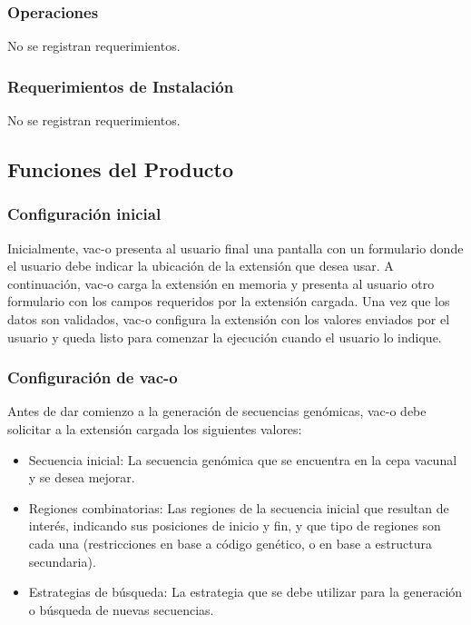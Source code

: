 \documentclass[10pt,a4paper]{article}
\begin{document}
    \subsubsection{Operaciones}
    No se registran requerimientos.

    \subsubsection{Requerimientos de Instalaci\'on}
    No se registran requerimientos.

  \subsection{Funciones del Producto}
  
  \subsubsection{Configuraci\'on inicial}
  Inicialmente, vac-o presenta al usuario final una pantalla con un formulario donde el usuario debe indicar la ubicaci\'on de la extensi\'on que desea usar. A continuaci\'on, vac-o carga la extensi\'on en memoria y presenta al usuario otro formulario con los campos requeridos por la extensi\'on cargada.
  Una vez que los datos son validados, vac-o configura la extensi\'on con los valores enviados por el usuario y queda listo para comenzar la ejecuci\'on cuando el usuario lo indique.

  \subsubsection{Configuraci\'on de vac-o}
  Antes de dar comienzo a la generaci\'on de secuencias gen\'omicas, vac-o debe solicitar a la extensi\'on cargada los siguientes valores:
  \begin{itemize}
    \item Secuencia inicial: La secuencia gen\'omica que se encuentra en la cepa vacunal y se desea mejorar.
    \item Regiones combinatorias: Las regiones de la secuencia inicial que resultan de inter\'es, indicando sus posiciones de inicio y fin, y que tipo de regiones son cada una (restricciones en base a c\'odigo gen\'etico, o en base a estructura secundaria).
    \item Estrategias de b\'usqueda: La estrategia que se debe utilizar para la generaci\'on o b\'usqueda de nuevas secuencias.
  \end{itemize}
  
\end{document}
